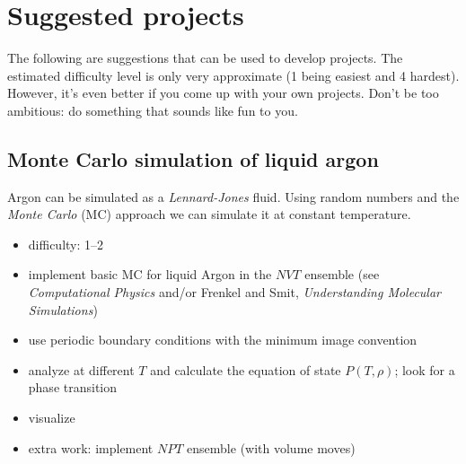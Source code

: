 \documentclass[letterpaper]{scrartcl}
\begin{document}
\section{Suggested projects}
\label{sec:suggestions}

The following are suggestions that can be used to develop
projects. The estimated difficulty level is only very approximate (1
being easiest and 4 hardest). However, it's even better if you come up
with your own projects. Don't be too ambitious: do something that
sounds like fun to you.

\subsection{Monte Carlo simulation of liquid argon}

Argon can be simulated as a \emph{Lennard-Jones} fluid. Using random
numbers and the \emph{Monte Carlo} (MC) approach we can simulate it at
constant temperature.

\begin{itemize}
\item difficulty: 1--2
\item implement basic MC for liquid Argon in the $NVT$ ensemble (see
  \emph{Computational Physics} and/or Frenkel and Smit,
  \emph{Understanding Molecular Simulations})
\item use periodic boundary conditions with the minimum image
  convention
\item analyze at different $T$ and calculate the equation of state
  $P(T, \rho)$; look for a phase transition
\item visualize
\item extra work: implement $NPT$ ensemble (with volume moves)
\end{itemize}




\end{document}
